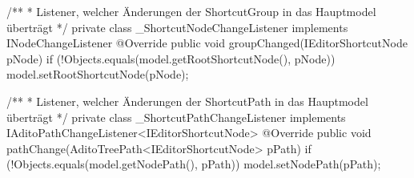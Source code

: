 \begin{spacing}{0.75}
\begin{javacode}[firstnumber=21]
{  /**
  * Listener, welcher Änderungen der ShortcutGroup in das Hauptmodel überträgt
  */
  private class _ShortcutNodeChangeListener implements INodeChangeListener
  {
    @Override
    public void groupChanged(IEditorShortcutNode pNode)
    {
      if (!Objects.equals(model.getRootShortcutNode(), pNode))
      model.setRootShortcutNode(pNode);
    }
  }
  
  /**
  * Listener, welcher Änderungen der ShortcutPath in das Hauptmodel überträgt
  */
  private class _ShortcutPathChangeListener implements IAditoPathChangeListener<IEditorShortcutNode>
  {
    @Override
    public void pathChange(AditoTreePath<IEditorShortcutNode> pPath)
    {
      if (!Objects.equals(model.getNodePath(), pPath))
      model.setNodePath(pPath);
    }
  }
}
\end{javacode}
\end{spacing}